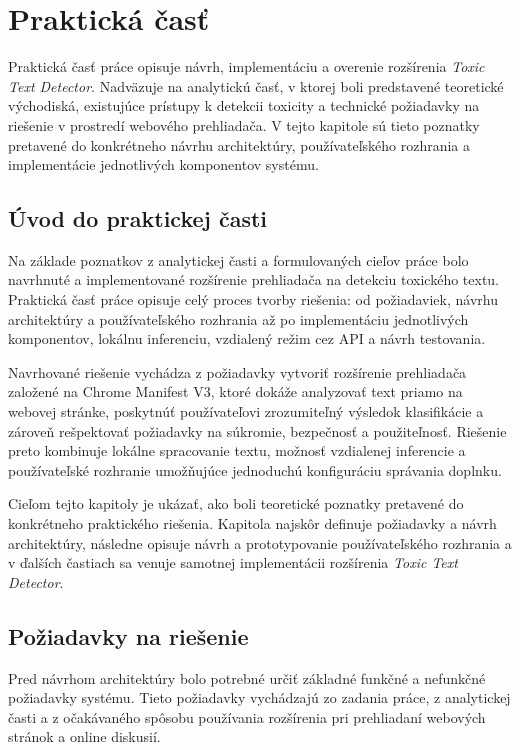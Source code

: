 \chapter{Praktická časť}

Praktická časť práce opisuje návrh, implementáciu a overenie rozšírenia \textit{Toxic Text Detector}. Nadväzuje na analytickú časť, v ktorej boli predstavené teoretické východiská, existujúce prístupy k detekcii toxicity a technické požiadavky na riešenie v prostredí webového prehliadača. V tejto kapitole sú tieto poznatky pretavené do konkrétneho návrhu architektúry, používateľského rozhrania a implementácie jednotlivých komponentov systému.


\section{Úvod do praktickej časti}
Na základe poznatkov z analytickej časti a formulovaných cieľov práce bolo navrhnuté a implementované rozšírenie prehliadača na detekciu toxického textu. Praktická časť práce opisuje celý proces tvorby riešenia: od požiadaviek, návrhu architektúry a používateľského rozhrania až po implementáciu jednotlivých komponentov, lokálnu inferenciu, vzdialený režim cez API a návrh testovania.

Navrhované riešenie vychádza z požiadavky vytvoriť rozšírenie prehliadača založené na Chrome Manifest V3, ktoré dokáže analyzovať text priamo na webovej stránke, poskytnúť používateľovi zrozumiteľný výsledok klasifikácie a zároveň rešpektovať požiadavky na súkromie, bezpečnosť a použiteľnosť. Riešenie preto kombinuje lokálne spracovanie textu, možnosť vzdialenej inferencie a používateľské rozhranie umožňujúce jednoduchú konfiguráciu správania doplnku.

Cieľom tejto kapitoly je ukázať, ako boli teoretické poznatky pretavené do konkrétneho praktického riešenia. Kapitola najskôr definuje požiadavky a návrh architektúry, následne opisuje návrh a prototypovanie používateľského rozhrania a v ďalších častiach sa venuje samotnej implementácii rozšírenia \textit{Toxic Text Detector}.

\section{Požiadavky na riešenie}
Pred návrhom architektúry bolo potrebné určiť základné funkčné a nefunkčné požiadavky systému. Tieto požiadavky vychádzajú zo zadania práce, z analytickej časti a z očakávaného spôsobu používania rozšírenia pri prehliadaní webových stránok a online diskusií.

